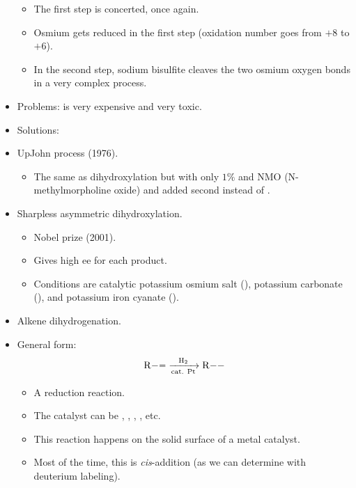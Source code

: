 \documentclass[../notes.tex]{subfiles}
\begin{document}
\begin{itemize}
\begin{itemize}
        \item The first step is concerted, once again.
        \item Osmium gets reduced in the first step (oxidation number goes from $+8$ to $+6$).
        \item In the second step, sodium bisulfite cleaves the two osmium oxygen bonds in a very complex process.
    \end{itemize}
    \item Problems:  is very expensive and very toxic.
    \item Solutions:
    \item UpJohn process (1976).
    \begin{itemize}
        \item The same as dihydroxylation but with only $1\%$  and NMO (N-methylmorpholine oxide) and  added second instead of .
    \end{itemize}
    \item Sharpless asymmetric dihydroxylation.
    \begin{itemize}
        \item Nobel prize (2001).
        \item Gives high ee for each product.
        \item Conditions are catalytic potassium osmium salt (), potassium carbonate (), and potassium iron cyanate ().
    \end{itemize}
    \item Alkene dihydrogenation.
    \item {}General form:
    \begin{equation*}
        \ce{R-= ->[H2][\text{cat. }Pt] R--}
    \end{equation*}
    \begin{itemize}
        \item A reduction reaction.
        \item The catalyst can be , , , , etc.
        \item This reaction happens on the solid surface of a metal catalyst.
        \item Most of the time, this is \emph{cis}-addition (as we can determine with deuterium labeling).
    \end{itemize}
\end{itemize}
\end{document}
